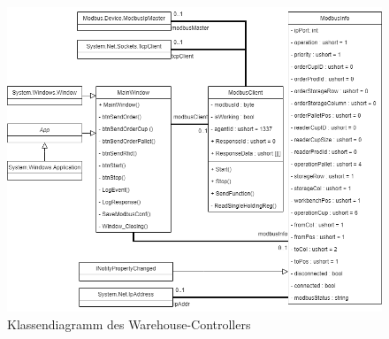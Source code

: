     \begin{figure}[h]
        \label{fig:figure6}
        \includegraphics[width = \textwidth ]{Bilder/C_Klassendiagramm}
        \caption[Klassendiagramm des Controllers ]%
        {\small Klassendiagramm des Warehouse-Controllers}
        \centering
    \end{figure}


